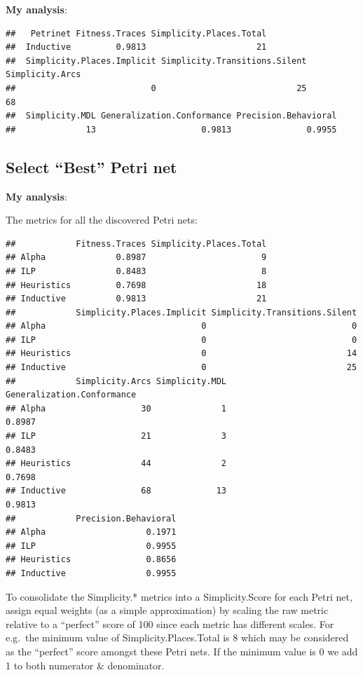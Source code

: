 \documentclass[]{article}
\begin{document}
\textbf{My analysis}:

\begin{verbatim}
##   Petrinet Fitness.Traces Simplicity.Places.Total
##  Inductive         0.9813                      21
##  Simplicity.Places.Implicit Simplicity.Transitions.Silent Simplicity.Arcs
##                           0                            25              68
##  Simplicity.MDL Generalization.Conformance Precision.Behavioral
##              13                     0.9813               0.9955
\end{verbatim}

\subsection{Select ``Best'' Petri net}\label{select-best-petri-net}

\textbf{My analysis}:

The metrics for all the discovered Petri nets:

\begin{verbatim}
##            Fitness.Traces Simplicity.Places.Total
## Alpha              0.8987                       9
## ILP                0.8483                       8
## Heuristics         0.7698                      18
## Inductive          0.9813                      21
##            Simplicity.Places.Implicit Simplicity.Transitions.Silent
## Alpha                               0                             0
## ILP                                 0                             0
## Heuristics                          0                            14
## Inductive                           0                            25
##            Simplicity.Arcs Simplicity.MDL Generalization.Conformance
## Alpha                   30              1                     0.8987
## ILP                     21              3                     0.8483
## Heuristics              44              2                     0.7698
## Inductive               68             13                     0.9813
##            Precision.Behavioral
## Alpha                    0.1971
## ILP                      0.9955
## Heuristics               0.8656
## Inductive                0.9955
\end{verbatim}

To consolidate the Simplicity.* metrics into a Simplicity.Score for each
Petri net, assign equal weights (as a simple approximation) by scaling
the raw metric relative to a ``perfect'' score of 100 since each metric
has different scales. For e.g.~the minimum value of
Simplicity.Places.Total is 8 which may be considered as the ``perfect''
score amongst these Petri nets. If the minimum value is 0 we add 1 to
both numerator \& denominator.
\end{document}
